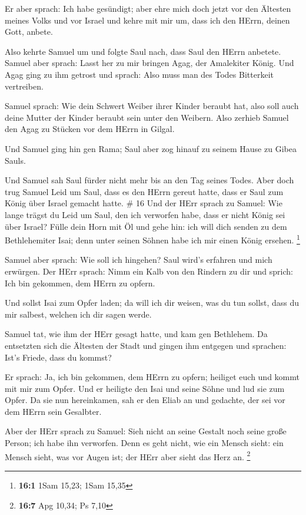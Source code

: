  Er aber sprach: Ich habe gesündigt; aber ehre mich doch
jetzt vor den Ältesten meines Volks und vor Israel und kehre mit mir um,
dass ich den HErrn, deinen Gott, anbete.

 Also kehrte Samuel um und folgte Saul nach, dass Saul den
HErrn anbetete.  Samuel aber sprach: Lasst her zu mir
bringen Agag, der Amalekiter König. Und Agag ging zu ihm getrost und
sprach: Also muss man des Todes Bitterkeit vertreiben.

 Samuel sprach: Wie dein Schwert Weiber ihrer Kinder
beraubt hat, also soll auch deine Mutter der Kinder beraubt sein unter
den Weibern. Also zerhieb Samuel den Agag zu Stücken vor dem HErrn in
Gilgal.

 Und Samuel ging hin gen Rama; Saul aber zog hinauf zu
seinem Hause zu Gibea Sauls.

 Und Samuel sah Saul fürder nicht mehr bis an den Tag
seines Todes. Aber doch trug Samuel Leid um Saul, dass es den HErrn
gereut hatte, dass er Saul zum König über Israel gemacht hatte. \# 16
 Und der HErr sprach zu Samuel: Wie lange trägst du Leid um
Saul, den ich verworfen habe, dass er nicht König sei über Israel? Fülle
dein Horn mit Öl und gehe hin: ich will dich senden zu dem Bethlehemiter
Isai; denn unter seinen Söhnen habe ich mir einen König ersehen.
\footnote{\textbf{16:1} 1Sam 15,23; 1Sam 15,35}

 Samuel aber sprach: Wie soll ich hingehen? Saul wird's
erfahren und mich erwürgen. Der HErr sprach: Nimm ein Kalb von den
Rindern zu dir und sprich: Ich bin gekommen, dem HErrn zu opfern.

 Und sollst Isai zum Opfer laden; da will ich dir weisen,
was du tun sollst, dass du mir salbest, welchen ich dir sagen werde.

 Samuel tat, wie ihm der HErr gesagt hatte, und kam gen
Bethlehem. Da entsetzten sich die Ältesten der Stadt und gingen ihm
entgegen und sprachen: Ist's Friede, dass du kommst?

 Er sprach: Ja, ich bin gekommen, dem HErrn zu opfern;
heiliget euch und kommt mit mir zum Opfer. Und er heiligte den Isai und
seine Söhne und lud sie zum Opfer.  Da sie nun hereinkamen,
sah er den Eliab an und gedachte, der sei vor dem HErrn sein Gesalbter.

 Aber der HErr sprach zu Samuel: Sieh nicht an seine Gestalt
noch seine große Person; ich habe ihn verworfen. Denn es geht nicht, wie
ein Mensch sieht: ein Mensch sieht, was vor Augen ist; der HErr aber
sieht das Herz an. \footnote{\textbf{16:7} Apg 10,34; Ps 7,10}

